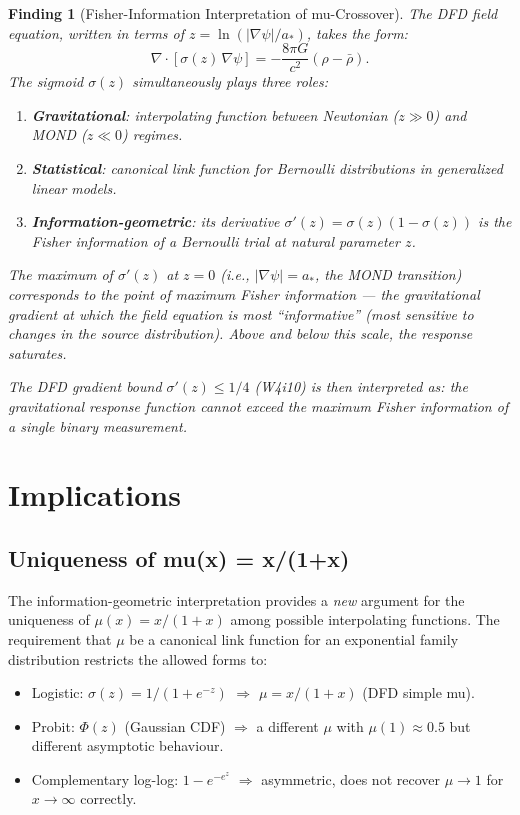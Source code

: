 \documentclass[11pt]{article}
\newtheorem{finding}{Finding}
\newcommand{\mufd}{\mu}
\begin{document}
\begin{finding}[Fisher-Information Interpretation of mu-Crossover]
\label{find:fisher}
The DFD field equation, written in terms of $z = \ln(|\nabla\psi|/a_*)$,
takes the form:
\begin{equation}
\nabla\cdot\left[\sigma(z)\,\nabla\psi\right] = -\frac{8\pi G}{c^2}
(\rho - \bar{\rho}).
\end{equation}
The sigmoid $\sigma(z)$ simultaneously plays three roles:
\begin{enumerate}[nosep]
\item \textbf{Gravitational}: interpolating function between Newtonian
  ($z \gg 0$) and MOND ($z \ll 0$) regimes.
\item \textbf{Statistical}: canonical link function for Bernoulli
  distributions in generalized linear models.
\item \textbf{Information-geometric}: its derivative $\sigma'(z) =
  \sigma(z)(1-\sigma(z))$ is the Fisher information of a Bernoulli
  trial at natural parameter $z$.
\end{enumerate}

The maximum of $\sigma'(z)$ at $z = 0$ (i.e., $|\nabla\psi| = a_*$,
the MOND transition) corresponds to the point of \emph{maximum Fisher
information} --- the gravitational gradient at which the field equation
is most ``informative'' (most sensitive to changes in the source
distribution). Above and below this scale, the response saturates.

The DFD gradient bound $\sigma'(z) \leq 1/4$ (W4i10) is then
interpreted as: \emph{the gravitational response function cannot
exceed the maximum Fisher information of a single binary
measurement.}
\end{finding}

\section{Implications}

\subsection{Uniqueness of mu(x) = x/(1+x)}

The information-geometric interpretation provides a \emph{new}
argument for the uniqueness of $\mufd(x) = x/(1+x)$ among
possible interpolating functions. The requirement that $\mufd$
be a canonical link function for an exponential family distribution
restricts the allowed forms to:
\begin{itemize}[nosep]
\item Logistic: $\sigma(z) = 1/(1+e^{-z})$ $\Rightarrow$
  $\mufd = x/(1+x)$ (DFD simple mu).
\item Probit: $\Phi(z)$ (Gaussian CDF) $\Rightarrow$ a different
  $\mufd$ with $\mufd(1) \approx 0.5$ but different asymptotic
  behaviour.
\item Complementary log-log: $1 - e^{-e^z}$ $\Rightarrow$ asymmetric,
  does not recover $\mufd \to 1$ for $x \to \infty$ correctly.
\end{itemize}
\end{document}
